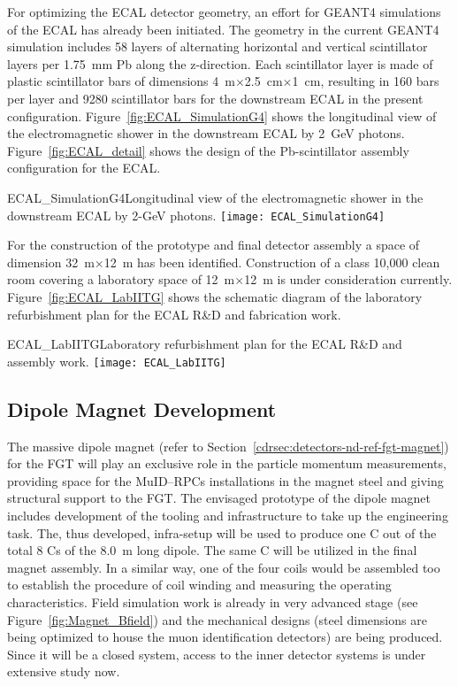 For optimizing the ECAL detector geometry, an effort for GEANT4
simulations of the ECAL has already been initiated. The geometry in
the current GEANT4 simulation includes 58 layers of alternating
horizontal and vertical scintillator layers per 1.75~mm Pb along the
z-direction. Each scintillator layer is made of plastic scintillator
bars of dimensions 4~m$\times$2.5~cm$\times$1~cm, resulting in 160
bars per layer and 9280 scintillator bars for the downstream ECAL in
the present configuration.  Figure~\ref{fig:ECAL_SimulationG4} shows
the longitudinal view of the electromagnetic shower in the downstream
ECAL by 2~GeV photons. Figure~\ref{fig:ECAL_detail} shows the design
of the Pb-scintillator assembly configuration for the ECAL.
\begin{cdrfigure}  
{ECAL_SimulationG4}{Longitudinal view of the electromagnetic shower in 
the downstream ECAL by 2-GeV photons.}  
\texttt{[image: ECAL\_SimulationG4]}
\end{cdrfigure}

For the construction of the prototype and final detector assembly a
space of dimension 32~m$\times$12~m has been
identified. Construction of a class 10,000 clean room covering a
laboratory space of 12~m$\times$12~m is under consideration
currently. Figure~\ref{fig:ECAL_LabIITG} shows the schematic diagram
of the laboratory refurbishment plan for the ECAL R\&D and fabrication
work.
\begin{cdrfigure}  
{ECAL_LabIITG}{Laboratory refurbishment plan for the ECAL R\&D and assembly work.}  
\texttt{[image: ECAL\_LabIITG]}
\end{cdrfigure}


\subsection{Dipole Magnet Development} 

The massive dipole magnet (refer to
Section~\ref{cdrsec:detectors-nd-ref-fgt-magnet}) for the FGT will
play an exclusive role in the particle momentum measurements,
providing space for the MuID--RPCs installations in the magnet steel
and giving structural support to the FGT. The envisaged prototype of
the dipole magnet includes development of the tooling and
infrastructure to take up the engineering task.  The, thus developed,
infra-setup will be used to produce one C out of the total 8 Cs of the
8.0~m long dipole.  The same C will be utilized in the final magnet
assembly. In a similar way, one of the four coils would be assembled
too to establish the procedure of coil winding and measuring the
operating characteristics.  Field simulation work is already in very
advanced stage (see Figure~\ref{fig:Magnet_Bfield}) and the mechanical
designs (steel dimensions are being optimized to house the muon
identification detectors) are being produced.  Since it will be a
closed system, access to the inner detector systems is under extensive
study now.




